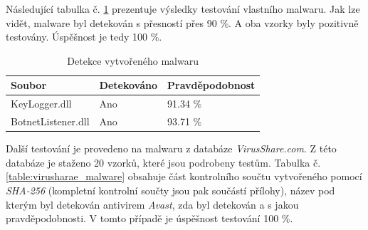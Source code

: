 Následující tabulka č. \ref{table:my_malware} prezentuje výsledky testování vlastního malwaru. Jak lze vidět, malware byl detekován s přesností přes 90 \%. A oba vzorky byly pozitivně testovány. Úspěšnost je tedy 100 \%.

\begin{table}[H]
    \centering
    \begin{tabular}{|l|l|l|}
        \hline
        Soubor & Detekováno & Pravděpodobnost\\ \hline
        \hline
        KeyLogger.dll	&	Ano	&	91.34 \% \\ \hline
        BotnetListener.dll	&	Ano	&	93.71 \% \\ \hline
    \end{tabular}
    \caption{Detekce vytvořeného malwaru}
    \label{table:my_malware}
\end{table}

Další testování je provedeno na malwaru z databáze \emph{VirusShare.com}. Z této databáze je staženo 20 vzorků, které jsou podrobeny testům. Tabulka č. \ref{table:virusharae_malware} obsahuje část kontrolního součtu vytvořeného pomocí \emph{SHA-256} (kompletní kontrolní součty jsou pak součástí přílohy), název pod kterým byl detekován antivirem \emph{Avast}, zda byl detekován a s jakou pravděpodobnosti. V tomto případě je úspěšnost testování 100 \%.

